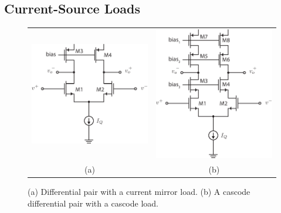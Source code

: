 \subsection{Current-Source Loads}
\begin{figure}[tb]
\centering
\begin{tabular}{cc}
\includegraphics[scale=1]{Diff_mirror_load.pdf} &
\includegraphics[scale=1]{Diff_mirror_cascode.pdf}\\
(a) & (b)\\
\end{tabular}
\caption{(a) Differential pair with a current mirror load.  (b) A cascode differential pair with a cascode load.}
\label{fig:Diff_mirror_load.pdf}
\end{figure}
